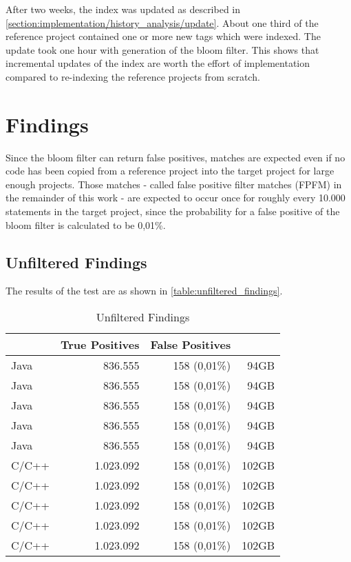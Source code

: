 After two weeks, the index was updated as described in \ref{section:implementation/history_analysis/update}.
About one third of the reference project contained one or more new tags which were indexed.
The update took one hour with generation of the bloom filter.
This shows that incremental updates of the index are worth the effort of implementation compared to re-indexing the reference projects from scratch.

\section{Findings}
Since the bloom filter can return false positives, matches are expected even if no code has been copied from a reference project into the target project for large enough projects.
Those matches - called false positive filter matches (FPFM) in the remainder of this work - are expected to occur once for roughly every 10.000 statements in the target project, since the probability for a false positive of the bloom filter is calculated to be 0,01\%.

\subsection{Unfiltered Findings}
The results of the test are as shown in \autoref{table:unfiltered_findings}.

\begin{table}[ht]
	\centering
	\begin{tabular}{l|rrr}
		& \textbf{True Positives} & \textbf{False Positives} & \textbf{} \\ 
		\hline 
		Java & 836.555 & 158 (0,01\%) & 94GB \\ 
		Java & 836.555 & 158 (0,01\%) & 94GB \\ 
		Java & 836.555 & 158 (0,01\%) & 94GB \\ 
		Java & 836.555 & 158 (0,01\%) & 94GB \\ 
		Java & 836.555 & 158 (0,01\%) & 94GB \\ 
		\hline
		C/C++ & 1.023.092 & 158 (0,01\%) & 102GB \\ 
		C/C++ & 1.023.092 & 158 (0,01\%) & 102GB \\ 
		C/C++ & 1.023.092 & 158 (0,01\%) & 102GB \\ 
		C/C++ & 1.023.092 & 158 (0,01\%) & 102GB \\ 
		C/C++ & 1.023.092 & 158 (0,01\%) & 102GB \\ 
	\end{tabular}
	\caption{Unfiltered Findings}\label{table:unfiltered_findings}
\end{table} 

